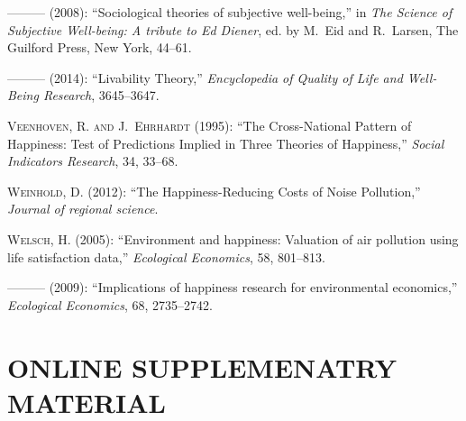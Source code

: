 \documentclass[10pt, letterpaper]{article}
\begin{document}
\begin{spacing}{1.4}
\begin{thebibliography}{36}
---\hspace{-.1pt}---\hspace{-.1pt}--- (2008): \enquote{Sociological theories of
  subjective well-being,} in \emph{The Science of Subjective Well-being: A
  tribute to Ed Diener}, ed. by M.~Eid and R.~Larsen, The Guilford Press, New
  York, 44--61.

---\hspace{-.1pt}---\hspace{-.1pt}--- (2014): \enquote{Livability Theory,}
  \emph{Encyclopedia of Quality of Life and Well-Being Research}, 3645--3647.

\textsc{Veenhoven, R. and J.~Ehrhardt} (1995): \enquote{The Cross-National
  Pattern of Happiness: Test of Predictions Implied in Three Theories of
  Happiness,} \emph{Social Indicators Research}, 34, 33--68.

\textsc{Weinhold, D.} (2012): \enquote{The Happiness-Reducing Costs of Noise
  Pollution,} \emph{Journal of regional science}.

\textsc{Welsch, H.} (2005): \enquote{Environment and happiness: Valuation of
  air pollution using life satisfaction data,} \emph{Ecological Economics}, 58,
  801--813.

---\hspace{-.1pt}---\hspace{-.1pt}--- (2009): \enquote{Implications of
  happiness research for environmental economics,} \emph{Ecological Economics},
  68, 2735--2742.

\end{thebibliography}



\newpage
\section{ONLINE SUPPLEMENATRY MATERIAL}



\end{spacing}
\end{document}
